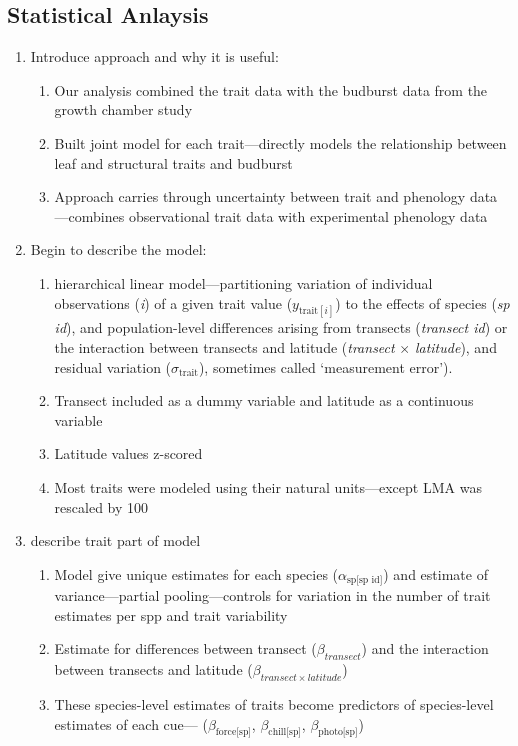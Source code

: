 \documentclass{article}
\begin{document}
\subsection*{Statistical Anlaysis}

\begin{enumerate}
\item Introduce approach and why it is useful:
\begin{enumerate}
\item Our analysis combined the trait data with the budburst data from the growth chamber study
\item Built joint model for each trait---directly models the relationship between leaf and structural traits and budburst 
\item Approach carries through uncertainty between trait and phenology data---combines observational trait data with experimental phenology data
\end{enumerate}

\item Begin to describe the model:
\begin{enumerate}
\item hierarchical linear model---partitioning variation of individual observations (\emph{i}) of a given trait value ($y_{\text{trait}[i]}$) to the effects of species (\emph{sp id}), and population-level differences arising from transects (\emph{transect id}) or the interaction between transects and latitude (\emph{transect} $\times$ \emph{latitude}), and residual variation ($\sigma_{\text{trait}}$), sometimes called `measurement error').
\item Transect included as a dummy variable and latitude as a continuous variable 
\item Latitude values z-scored 
\item Most traits were modeled using their natural units---except LMA was rescaled by 100
\end{enumerate}

\item describe trait part of model
\begin{enumerate}
\item Model give unique estimates for each species ($\alpha_{\text{sp[sp id]}}$) and estimate of variance---partial pooling---controls for variation in the number of trait estimates per spp and trait variability 
\item Estimate for differences between transect ($\beta_{transect}$) and the interaction between transects and latitude ($\beta_{transect \times latitude}$) 
\item These species-level estimates of traits become predictors of species-level estimates of each cue--- ($\beta_{\text{force[sp]}}$, $\beta_{\text{chill[sp]}}$, $\beta_{\text{photo[sp]}}$) 
\end{enumerate}


\end{enumerate}
\end{document}
